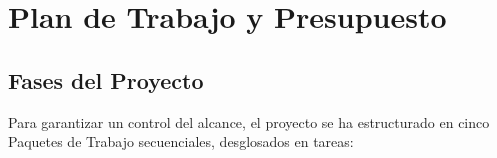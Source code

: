 \chapter{Plan de Trabajo y Presupuesto}
\label{cap:plan_trabajo_presupuesto}

\section{Fases del Proyecto}
\label{sec:fases_metodologia}

\label{subsec:edt_wbs}

Para garantizar un control del alcance, el proyecto se ha estructurado en cinco Paquetes de Trabajo secuenciales, desglosados en tareas:

